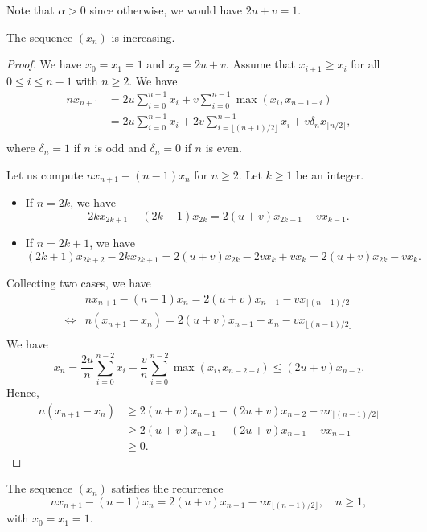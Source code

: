 Note that $\alpha>0$ since otherwise, we would have $2u+v = 1$.

\begin{proposition}
  The sequence $(x_n)$ is increasing.
\end{proposition}

\begin{proof}
  We have $x_0=x_1=1$ and $x_2=2u+v$. Assume that $x_{i+1}\ge x_i$ for all $0\le i \le n-1$ with $n\ge 2$. We have
  \begin{align*}
    nx_{n+1}
     & = 2u\sum_{i=0}^{n-1}x_i + v\sum_{i=0}^{n-1}\max(x_{i}, x_{n-1-i})                                       \\
     & = 2u\sum_{i=0}^{n-1}x_i + 2v\sum_{i=\lfloor (n+1)/2\rfloor}^{n-1}x_{i}+v\delta_nx_{\lfloor n/2\rfloor}, \\
  \end{align*}
  where $\delta_n = 1$ if $n$ is odd and $\delta_n = 0$ if $n$ is even.

  Let us compute $nx_{n+1}-(n-1)x_n$ for $n\ge 2$. Let $k\ge 1$ be an integer.
  \begin{itemize}
    \item If $n=2k$, we have
          $$2kx_{2k+1}-(2k-1)x_{2k} = 2(u+v)x_{2k-1} - vx_{k-1}.$$
    \item If $n=2k+1$, we have
          $$(2k+1)x_{2k+2}-2kx_{2k+1} = 2(u+v)x_{2k} -2vx_{k} + vx_{k} = 2(u+v)x_{2k} - vx_{k}.$$
  \end{itemize}
  Collecting two cases, we have
  \begin{align*}
         & nx_{n+1}-(n-1)x_n = 2(u+v)x_{n-1} - vx_{\lfloor (n-1)/2\rfloor}    \\
    \iff & n(x_{n+1}-x_n) = 2(u+v)x_{n-1} - x_n - vx_{\lfloor (n-1)/2\rfloor} \\
  \end{align*}
  We have
  $$x_n=\dfrac{2u}{n}\sum_{i=0}^{n-2}x_i+\dfrac{v}{n}\sum_{i=0}^{n-2}\max(x_{i}, x_{n-2-i}) \le (2u+v)x_{n-2}.$$
  Hence,
  \begin{align*}
    n(x_{n+1}-x_n)
     & \ge 2(u+v)x_{n-1} - (2u+v)x_{n-2} - vx_{\lfloor (n-1)/2\rfloor} \\
     & \ge 2(u+v)x_{n-1} - (2u+v)x_{n-1} - vx_{n-1}                    \\
     & \ge 0.
  \end{align*}

\end{proof}

\begin{proposition}
  The sequence $(x_n)$ satisfies the recurrence
  \begin{equation}
    nx_{n+1}-(n-1)x_n = 2(u+v)x_{n-1} - vx_{\lfloor (n-1)/2\rfloor}, \quad n\ge 1,
  \end{equation}
  with $x_0=x_1=1$.
\end{proposition}



